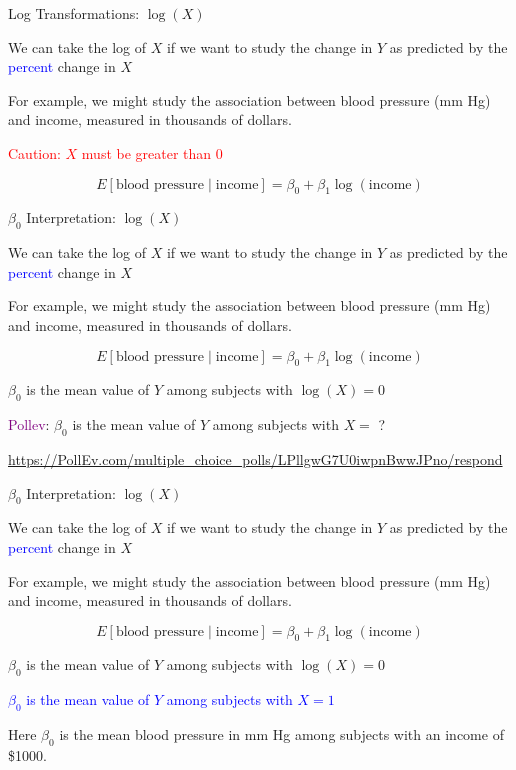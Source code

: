 \documentclass[10pt,t]{beamer}
\begin{document}
\begin{frame}{Log Transformations: $\log(X)$}
	
	We can take the log of $X$ if we want to study the change in $Y$ as predicted by the \textcolor{blue}{percent} change in $X$
	\medskip
	
	For example, we might study the association between blood pressure (mm Hg) and income, measured in thousands of dollars. \pause
	\medskip
	
	\textcolor{red}{Caution: $X$ must be greater than 0} \pause
	
	$$
	E[\text{blood pressure} \mid \text{income}] = \beta_0 + \beta_1 \log(\text{income})
	$$
	
\end{frame}

\begin{frame}{$\beta_0$ Interpretation: $\log(X)$}
	
	We can take the log of $X$ if we want to study the change in $Y$ as predicted by the \textcolor{blue}{percent} change in $X$
	\medskip
	
	For example, we might study the association between blood pressure (mm Hg) and income, measured in thousands of dollars. 
	\medskip
	
	$$
	E[\text{blood pressure} \mid \text{income}] = \beta_0 + \beta_1 \log(\text{income})
	$$
	\bigskip
	
	$\beta_0$ is the mean value of $Y$ among subjects with $\log(X) = 0$ 
	\medskip
	
	\textcolor{purple}{Pollev}: $\beta_0$ is the mean value of $Y$ among subjects with $X =$ ?
\medskip

\footnotesize{\url{https://PollEv.com/multiple_choice_polls/LPllgwG7U0iwpnBwwJPno/respond}}

\end{frame}

\begin{frame}{$\beta_0$ Interpretation: $\log(X)$}
	
We can take the log of $X$ if we want to study the change in $Y$ as predicted by the \textcolor{blue}{percent} change in $X$
\medskip

For example, we might study the association between blood pressure (mm Hg) and income, measured in thousands of dollars. 
\medskip

$$
E[\text{blood pressure} \mid \text{income}] = \beta_0 + \beta_1 \log(\text{income})
$$
\bigskip

$\beta_0$ is the mean value of $Y$ among subjects with $\log(X) = 0$ 
\medskip

\textcolor{blue}{$\beta_0$ is the mean value of $Y$ among subjects with $X = 1$} \pause
\bigskip

Here $\beta_0$ is the mean blood pressure in mm Hg among subjects with an income of \$1000. 

	
\end{frame}
\end{document}

